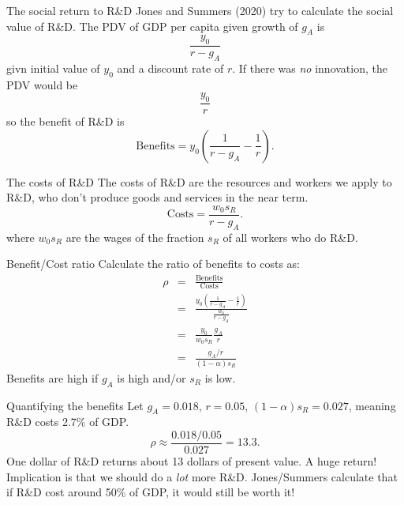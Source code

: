 \begin{frame}{The social return to R\&D}
Jones and Summers (2020) try to calculate the social value of R\&D. The PDV of GDP per capita given growth of $g_A$ is
\begin{equation}
	\frac{y_0}{r-g_A}
\end{equation}
givn initial value of $y_0$ and a discount rate of $r$. If there was \textit{no} innovation, the PDV would be
\begin{equation}
	\frac{y_0}{r}
\end{equation}
so the benefit of R\&D is
\begin{equation}
	\text{Benefits} = y_0\left(\frac{1}{r-g_A} - \frac{1}{r}\right).
\end{equation}
\end{frame}

\begin{frame}{The costs of R\&D}
The costs of R\&D are the resources and workers we apply to R\&D, who don't produce goods and services in the near term. 
\begin{equation}
	\text{Costs} = \frac{w_0s_R}{r-g_A}. \nonumber
\end{equation}
where $w_0 s_R$ are the wages of the fraction $s_R$ of all workers who do R\&D. 
\end{frame}

\begin{frame}{Benefit/Cost ratio}
Calculate the ratio of benefits to costs as:
\begin{eqnarray}
	\rho &=& \frac{\text{Benefits}}{\text{Costs}} \nonumber  \\ 
	     &=& \frac{y_0\left(\frac{1}{r-g_A} - \frac{1}{r}\right)}{\frac{w_0}{r-g_A}} \nonumber \\ 
	     &=& \frac{y_0}{w_0s_R}\frac{g_A}{r} \nonumber \\ 
	     &=& \frac{g_A/r}{(1-\alpha)s_R} \nonumber
\end{eqnarray}
Benefits are high if $g_A$ is high and/or $s_R$ is low. 
\end{frame}

\begin{frame}{Quantifying the benefits}
Let $g_A = 0.018$, $r=0.05$, $(1-\alpha)s_R = 0.027$, meaning R\&D costs 2.7\% of GDP.
\begin{equation}
	\rho \approx \frac{0.018/0.05}{0.027} = 13.3. \nonumber
\end{equation}
One dollar of R\&D returns about 13 dollars of present value. A huge return! Implication is that we should do a \textit{lot} more R\&D. Jones/Summers calculate that if R\&D cost around 50\% of GDP, it would still be worth it!
\end{frame}

